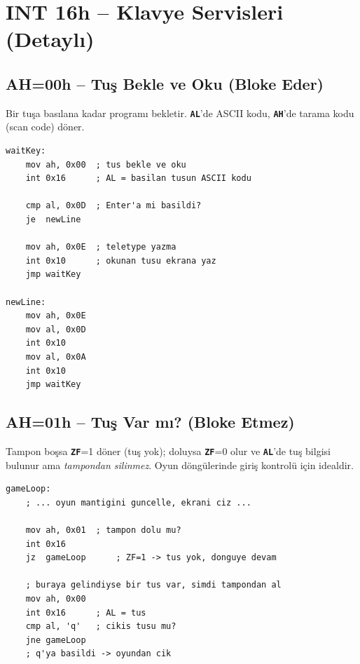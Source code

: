 \documentclass[11pt,a4paper]{article}
\newcommand{\reg}[1]{\texttt{\color{anaMavi}\textbf{#1}}}
\begin{document}
\section{INT 16h -- Klavye Servisleri (Detaylı)}

\subsection{AH=00h -- Tuş Bekle ve Oku (Bloke Eder)}

Bir tuşa basılana kadar programı bekletir. \reg{AL}'de ASCII kodu, \reg{AH}'de
tarama kodu (scan code) döner.

\begin{ornekkutu}
\begin{lstlisting}
waitKey:
    mov ah, 0x00  ; tus bekle ve oku
    int 0x16      ; AL = basilan tusun ASCII kodu

    cmp al, 0x0D  ; Enter'a mi basildi?
    je  newLine

    mov ah, 0x0E  ; teletype yazma
    int 0x10      ; okunan tusu ekrana yaz
    jmp waitKey

newLine:
    mov ah, 0x0E
    mov al, 0x0D
    int 0x10
    mov al, 0x0A
    int 0x10
    jmp waitKey
\end{lstlisting}
\end{ornekkutu}

\subsection{AH=01h -- Tuş Var mı? (Bloke Etmez)}

Tampon boşsa \reg{ZF}=1 döner (tuş yok); doluysa \reg{ZF}=0 olur ve \reg{AL}'de
tuş bilgisi bulunur ama \emph{tampondan silinmez}. Oyun döngülerinde giriş
kontrolü için idealdir.

\begin{ornekkutu}
\begin{lstlisting}
gameLoop:
    ; ... oyun mantigini guncelle, ekrani ciz ...

    mov ah, 0x01  ; tampon dolu mu?
    int 0x16
    jz  gameLoop      ; ZF=1 -> tus yok, donguye devam

    ; buraya gelindiyse bir tus var, simdi tampondan al
    mov ah, 0x00
    int 0x16      ; AL = tus
    cmp al, 'q'   ; cikis tusu mu?
    jne gameLoop
    ; q'ya basildi -> oyundan cik
\end{lstlisting}
\end{ornekkutu}
\end{document}

